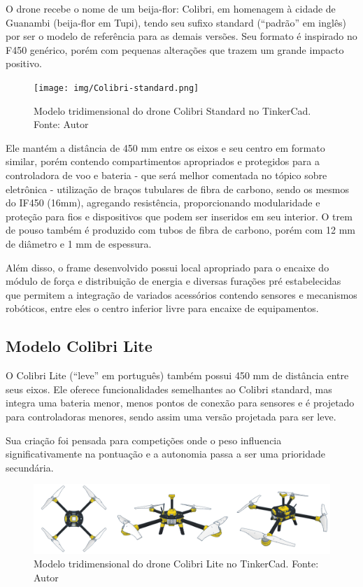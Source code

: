 \documentclass[conference]{IEEEtran}
\begin{document}
O drone recebe o nome de um beija-flor: Colibri, em homenagem à cidade de Guanambi (beija-flor em Tupi), tendo seu sufixo standard (“padrão” em inglês) por ser o modelo de referência para as demais versões. Seu formato é inspirado no F450 genérico, porém com pequenas alterações que trazem um grande impacto positivo.

\begin{figure}[!htb]
    \centering
    \texttt{[image: img/Colibri-standard.png]} 
    \caption{Modelo tridimensional do drone Colibri Standard no TinkerCad. Fonte: Autor}
    \label{fig:my_label}
\end{figure}

Ele mantém a distância de 450 mm entre os eixos e seu centro em formato similar, porém contendo compartimentos apropriados e protegidos para a controladora de voo e bateria - que será melhor comentada no tópico sobre eletrônica - utilização de braços tubulares de fibra de carbono, sendo os mesmos do IF450 (16mm), agregando resistência, proporcionando modularidade e proteção para fios e dispositivos que podem ser inseridos em seu interior. O trem de pouso também é produzido com tubos de fibra de carbono, porém com 12 mm de diâmetro e 1 mm de espessura.

Além disso, o frame desenvolvido possui local apropriado para o encaixe do módulo  de força e distribuição de energia e diversas furações pré estabelecidas que permitem a integração de variados acessórios contendo sensores e mecanismos robóticos, entre eles o centro inferior livre para encaixe de equipamentos.

\subsection{Modelo Colibri Lite}

O Colibri Lite (“leve” em português) também possui 450 mm de distância entre seus eixos. Ele oferece funcionalidades semelhantes ao Colibri standard, mas integra uma bateria menor, menos pontos de conexão para sensores e é projetado para controladoras menores, sendo assim uma versão projetada para ser leve.

Sua criação foi pensada para competições onde o peso influencia significativamente na pontuação e a autonomia passa a ser uma prioridade secundária.

\begin{figure}[!htb]
    \centering
    \includegraphics[scale=0.14]{img/Colibri-lite.png} 
    \caption{Modelo tridimensional do drone Colibri Lite no TinkerCad. Fonte: Autor}
    \label{fig:my_label}
\end{figure}
\end{document}
